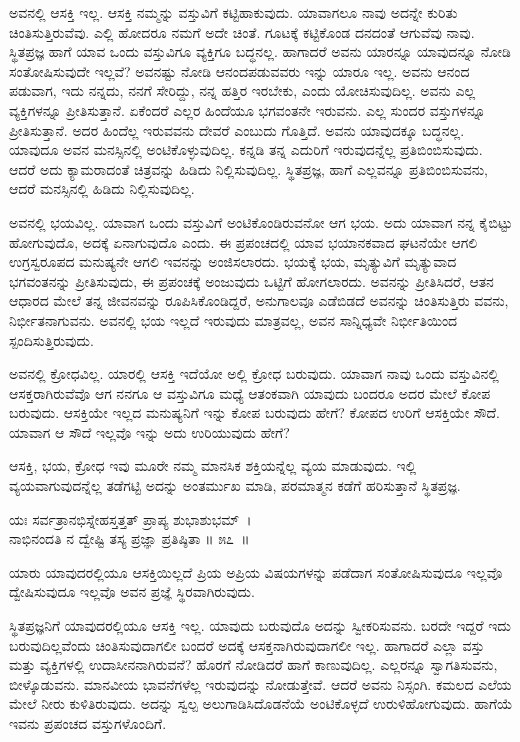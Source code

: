 ಅವನಲ್ಲಿ ಆಸಕ್ತಿ ಇಲ್ಲ. ಆಸಕ್ತಿ ನಮ್ಮನ್ನು ವಸ್ತುವಿಗೆ ಕಟ್ಟಿಹಾಕುವುದು. ಯಾವಾಗಲೂ ನಾವು ಅದನ್ನೇ ಕುರಿತು ಚಿಂತಿಸುತ್ತಿರುವೆವು. ಎಲ್ಲಿ ಹೋದರೂ ನಮಗೆ ಅದೇ ಚಿಂತೆ. ಗೂಟಕ್ಕೆ ಕಟ್ಟಿಕೊಂಡ ದನದಂತೆ ಆಗುವೆವು ನಾವು. ಸ್ಥಿತಪ್ರಜ್ಞ ಹಾಗೆ ಯಾವ ಒಂದು ವಸ್ತುವಿಗೂ ವ್ಯಕ್ತಿಗೂ ಬದ್ಧನಲ್ಲ. ಹಾಗಾದರೆ ಅವನು ಯಾರನ್ನೂ ಯಾವುದನ್ನೂ ನೋಡಿ ಸಂತೋಷಿಸುವುದೇ ಇಲ್ಲವೆ? ಅವನಷ್ಟು ನೋಡಿ ಆನಂದಪಡುವವರು ಇನ್ನು ಯಾರೂ ಇಲ್ಲ. ಅವನು ಆನಂದ ಪಡುವಾಗ, ಇದು ನನ್ನದು, ನನಗೆ ಸೇರಿದ್ದು, ನನ್ನ ಹತ್ತಿರ ಇರಬೇಕು, ಎಂದು ಯೋಚಿಸುವುದಿಲ್ಲ. ಅವನು ಎಲ್ಲ ವ್ಯಕ್ತಿಗಳನ್ನೂ ಪ್ರೀತಿಸುತ್ತಾನೆ. ಏಕೆಂದರೆ ಎಲ್ಲರ ಹಿಂದೆಯೂ ಭಗವಂತನೇ ಇರುವನು. ಎಲ್ಲ ಸುಂದರ ವಸ್ತುಗಳನ್ನೂ ಪ್ರೀತಿಸುತ್ತಾನೆ. ಅದರ ಹಿಂದೆಲ್ಲ ಇರುವವನು ದೇವರೆ ಎಂಬುದು ಗೊತ್ತಿದೆ. ಅವನು ಯಾವುದಕ್ಕೂ ಬದ್ಧನಲ್ಲ. ಯಾವುದೂ ಅವನ ಮನಸ್ಸಿನಲ್ಲಿ ಅಂಟಿಕೊಳ್ಳುವುದಿಲ್ಲ. ಕನ್ನಡಿ ತನ್ನ ಎದುರಿಗೆ ಇರುವುದನ್ನೆಲ್ಲ ಪ್ರತಿಬಿಂಬಿಸುವುದು. ಆದರೆ ಅದು ಕ್ಯಾಮರಾದಂತೆ ಚಿತ್ರವನ್ನು ಹಿಡಿದು ನಿಲ್ಲಿಸುವುದಿಲ್ಲ. ಸ್ಥಿತಪ್ರಜ್ಞ, ಹಾಗೆ ಎಲ್ಲವನ್ನೂ ಪ್ರತಿಬಿಂಬಿಸುವನು, ಆದರೆ ಮನಸ್ಸಿನಲ್ಲಿ ಹಿಡಿದು ನಿಲ್ಲಿಸುವುದಿಲ್ಲ.

ಅವನಲ್ಲಿ ಭಯವಿಲ್ಲ. ಯಾವಾಗ ಒಂದು ವಸ್ತುವಿಗೆ ಅಂಟಿಕೊಂಡಿರುವನೋ ಆಗ ಭಯ. ಅದು ಯಾವಾಗ ನನ್ನ ಕೈಬಿಟ್ಟು ಹೋಗುವುದೊ, ಅದಕ್ಕೆ ಏನಾಗುವುದೊ ಎಂದು. ಈ ಪ್ರಪಂಚದಲ್ಲಿ ಯಾವ ಭಯಾನಕವಾದ ಘಟನೆಯೇ ಆಗಲಿ ಉಗ್ರಸ್ವರೂಪದ ಮನುಷ್ಯನೇ ಆಗಲಿ ಇವನನ್ನು ಅಂಜಿಸಲಾರದು. ಭಯಕ್ಕೆ ಭಯ, ಮೃತ್ಯುವಿಗೆ ಮೃತ್ಯುವಾದ ಭಗವಂತನನ್ನು ಪ್ರೀತಿಸುವುದು, ಈ ಪ್ರಪಂಚಕ್ಕೆ ಅಂಜುವುದು ಒಟ್ಟಿಗೆ ಹೋಗಲಾರದು. ಅವನನ್ನು ಪ್ರೀತಿಸಿದರೆ, ಆತನ ಆಧಾರದ ಮೇಲೆ ತನ್ನ ಜೀವನವನ್ನು ರೂಪಿಸಿಕೊಂಡಿದ್ದರೆ, ಅನುಗಾಲವೂ ಎಡೆಬಿಡದೆ ಅವನನ್ನು ಚಿಂತಿಸುತ್ತಿರು ವವನು, ನಿರ್ಭೀತನಾಗುವನು. ಅವನಲ್ಲಿ ಭಯ ಇಲ್ಲದೆ ಇರುವುದು ಮಾತ್ರವಲ್ಲ, ಅವನ ಸಾನ್ನಿಧ್ಯವೇ ನಿರ್ಭೀತಿಯಿಂದ ಸ್ಪಂದಿಸುತ್ತಿರುವುದು.

ಅವನಲ್ಲಿ ಕ್ರೋಧವಿಲ್ಲ. ಯಾರಲ್ಲಿ ಆಸಕ್ತಿ ಇದೆಯೋ ಅಲ್ಲಿ ಕ್ರೋಧ ಬರುವುದು. ಯಾವಾಗ ನಾವು ಒಂದು ವಸ್ತುವಿನಲ್ಲಿ ಆಸಕ್ತರಾಗಿರುವೆವೊ ಆಗ ನನಗೂ ಆ ವಸ್ತುವಿಗೂ ಮಧ್ಯೆ ಆತಂಕವಾಗಿ ಯಾವುದು ಬಂದರೂ ಅದರ ಮೇಲೆ ಕೋಪ ಬರುವುದು. ಆಸಕ್ತಿಯೇ ಇಲ್ಲದ ಮನುಷ್ಯನಿಗೆ ಇನ್ನು ಕೋಪ ಬರುವುದು ಹೇಗೆ? ಕೋಪದ ಉರಿಗೆ ಆಸಕ್ತಿಯೇ ಸೌದೆ. ಯಾವಾಗ ಆ ಸೌದೆ ಇಲ್ಲವೊ ಇನ್ನು ಅದು ಉರಿಯುವುದು ಹೇಗೆ?

ಆಸಕ್ತಿ, ಭಯ, ಕ್ರೋಧ ಇವು ಮೂರೇ ನಮ್ಮ ಮಾನಸಿಕ ಶಕ್ತಿಯನ್ನೆಲ್ಲ ವ್ಯಯ ಮಾಡುವುದು. ಇಲ್ಲಿ ವ್ಯಯವಾಗುವುದನ್ನೆಲ್ಲ ತಡೆಗಟ್ಟಿ ಅದನ್ನು ಅಂತರ್ಮುಖ ಮಾಡಿ, ಪರಮಾತ್ಮನ ಕಡೆಗೆ ಹರಿಸುತ್ತಾನೆ ಸ್ಥಿತಪ್ರಜ್ಞ.

\begin{shloka}
ಯಃ ಸರ್ವತ್ರಾನಭಿಸ್ನೇಹಸ್ತತ್ತತ್ ಪ್ರಾಪ್ಯ ಶುಭಾಶುಭಮ್~।\\ನಾಭಿನಂದತಿ ನ ದ್ವೇಷ್ಟಿ ತಸ್ಯ ಪ್ರಜ್ಞಾ ಪ್ರತಿಷ್ಠಿತಾ \hfill॥ ೫೭~॥
\end{shloka}

\begin{artha}
ಯಾರು ಯಾವುದರಲ್ಲಿಯೂ ಆಸಕ್ತಿಯಿಲ್ಲದೆ ಪ್ರಿಯ ಅಪ್ರಿಯ ವಿಷಯಗಳನ್ನು ಪಡೆದಾಗ ಸಂತೋಷಿಸುವುದೂ ಇಲ್ಲವೊ ದ್ವೇಷಿಸುವುದೂ ಇಲ್ಲವೊ ಅವನ ಪ್ರಜ್ಞೆ ಸ್ಥಿರವಾಗಿರುವುದು.
\end{artha}

ಸ್ಥಿತಪ್ರಜ್ಞನಿಗೆ ಯಾವುದರಲ್ಲಿಯೂ ಆಸಕ್ತಿ ಇಲ್ಲ. ಯಾವುದು ಬರುವುದೊ ಅದನ್ನು ಸ್ವೀಕರಿಸುವನು. ಬರದೇ ಇದ್ದರೆ ಇದು ಬರುವುದಿಲ್ಲವೆಂದು ಚಿಂತಿಸುವುದಾಗಲೀ ಬಂದರೆ ಅದಕ್ಕೆ ಆಸಕ್ತನಾಗಿರುವುದಾಗಲೀ ಇಲ್ಲ. ಹಾಗಾದರೆ ಎಲ್ಲಾ ವಸ್ತು ಮತ್ತು ವ್ಯಕ್ತಿಗಳಲ್ಲಿ ಉದಾಸೀನನಾಗಿರುವನೆ? ಹೊರಗೆ ನೋಡಿದರೆ ಹಾಗೆ ಕಾಣುವುದಿಲ್ಲ. ಎಲ್ಲರನ್ನೂ ಸ್ವಾಗತಿಸುವನು, ಬೀಳ್ಕೊಡುವನು. ಮಾನವೀಯ ಭಾವನೆಗಳೆಲ್ಲ ಇರುವುದನ್ನು ನೋಡುತ್ತೇವೆ. ಆದರೆ ಅವನು ನಿಸ್ಸಂಗಿ. ಕಮಲದ ಎಲೆಯ ಮೇಲೆ ನೀರು ಕುಳಿತಿರುವುದು. ಅದನ್ನು ಸ್ವಲ್ಪ ಅಲುಗಾಡಿಸಿದೊಡನೆಯೆ ಅಂಟಿಕೊಳ್ಳದೆ ಉರುಳಿಹೋಗುವುದು. ಹಾಗೆಯೆ ಇವನು ಪ್ರಪಂಚದ ವಸ್ತುಗಳೊಂದಿಗೆ.


